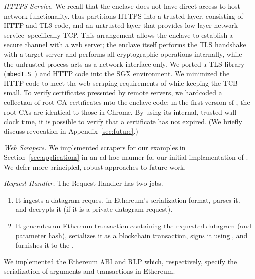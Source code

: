 \vspace{2mm}

\noindent\emph{HTTPS Service.} We recall that the enclave does not have direct
access to host network functionality. \tc thus partitions HTTPS into a trusted
layer, consisting of HTTP and TLS code, and an untrusted layer that provides
low-layer network service, specifically TCP.  This arrangement allows the
enclave to establish a secure channel with a web server; the enclave itself
performs the TLS handshake with a target server and performs all cryptographic
operations internally, while the untrusted process acts as a network interface
only. We ported a TLS library (\texttt{mbedTLS}~\cite{mbedtls}) and HTTP code into the SGX environment.
We minimized the HTTP code to meet the web-scraping requirements of \tc while
keeping the TCB small. To verify certificates presented by remote servers, we
hardcoded a collection of root CA certificates into the enclave code; in the
first version of \tc, the root CAs are identical to those in Chrome. By using its internal, trusted wall-clock time, it is possible to verify that a certificate has not expired. (We briefly discuss revocation in Appendix~\ref{sec:future}.)

\vspace{2mm}

\noindent\emph{Web Scrapers.} We implemented scrapers for our examples in Section~\ref{sec:applications} in an ad hoc manner for our initial implementation of \tc.
We defer more principled, robust approaches to future work. 

\vspace{2mm}

\noindent\emph{Request Handler.} The Request Handler has two jobs.
\begin{enumerate}
  \setlength{\itemsep}{2pt}
  \setlength{\parskip}{0pt}
  \setlength{\parsep}{0pt}
  \item It ingests a datagram request in Ethereum's serialization format, parses it, and decrypts it (if it is a private-datagram request).
  \item It generates an Ethereum transaction containing the requested datagram (and parameter hash), serializes it as a blockchain transaction, signs it using \skTC, and furnishes it to the \medname.
\end{enumerate}
We implemented the Ethereum ABI and RLP which, respectively, specify the serialization of arguments and transactions in Ethereum.

\vspace{2mm}

